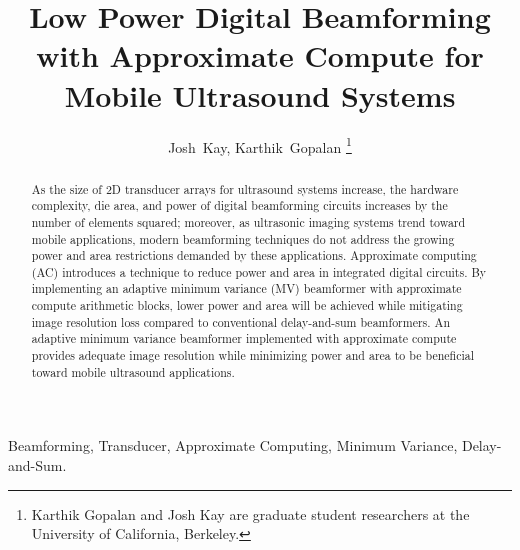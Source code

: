 \documentclass[journal]{IEEEtran}
\begin{document}
\title{Low Power Digital Beamforming\\ with Approximate Compute for Mobile Ultrasound Systems}

%

\author{Josh~Kay, Karthik~Gopalan %
\thanks{Karthik Gopalan and Josh Kay are graduate student researchers at the University of California, Berkeley.}}%




\maketitle

\begin{abstract}
As the size of 2D transducer arrays for ultrasound systems increase, the hardware complexity, die area, and power of digital beamforming circuits increases by the number of elements squared; moreover, as ultrasonic imaging systems trend toward mobile applications, modern beamforming techniques do not address the growing power and area restrictions demanded by these applications. Approximate computing (AC) introduces a technique to reduce power and area in integrated digital circuits. By implementing an adaptive minimum variance (MV) beamformer with approximate compute arithmetic blocks, lower power and area will be achieved while mitigating image resolution loss compared to conventional delay-and-sum beamformers. An adaptive minimum variance beamformer implemented with approximate compute provides adequate image resolution while minimizing power and area to be beneficial toward mobile ultrasound applications. 
\end{abstract}

\begin{IEEEkeywords}
Beamforming, Transducer, Approximate Computing, Minimum Variance, Delay-and-Sum.
\end{IEEEkeywords}


\IEEEpeerreviewmaketitle
\end{document}

